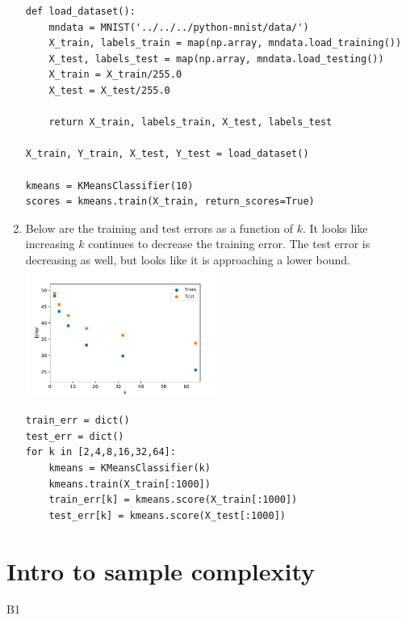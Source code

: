 \documentclass{article}
\begin{document}
\begin{enumerate}
\begin{verbatim}
def load_dataset():
    mndata = MNIST('../../../python-mnist/data/')
    X_train, labels_train = map(np.array, mndata.load_training())
    X_test, labels_test = map(np.array, mndata.load_testing())
    X_train = X_train/255.0
    X_test = X_test/255.0
    
    return X_train, labels_train, X_test, labels_test

X_train, Y_train, X_test, Y_test = load_dataset()

kmeans = KMeansClassifier(10)
scores = kmeans.train(X_train, return_scores=True)
        \end{verbatim}

        \item Below are the training and test errors as a function of $k$.
        It looks like increasing $k$ continues to decrease the training error.
        The test error is decreasing as well, but looks like it is approaching a lower bound. \\
        \includegraphics[width=0.5\textwidth]{code/A5d.pdf}
        \begin{verbatim}
train_err = dict()
test_err = dict()
for k in [2,4,8,16,32,64]:
    kmeans = KMeansClassifier(k)
    kmeans.train(X_train[:1000])
    train_err[k] = kmeans.score(X_train[:1000])
    test_err[k] = kmeans.score(X_test[:1000])
        \end{verbatim}
\end{enumerate}


\newpage
\section*{Intro to sample complexity}

B1
\end{document}
